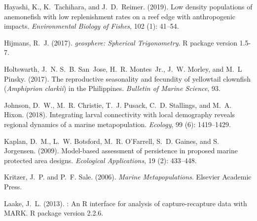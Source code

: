 \documentclass[12pt, oneside]{article}   	%
\begin{document}
\begin{thebibliography}{66}
Hayashi, K., K.~Tachihara, and J.~D.~Reimer. (2019).
\newblock Low density populations of anemonefish with low replenishment rates
  on a reef edge with anthropogenic impacts.
\newblock \emph{Environmental Biology of Fishes}, 102 (1):
  41--54.

Hijmans, R.~J. (2017).
\newblock \emph{geosphere: Spherical Trigonometry}.
\newblock R package version 1.5-7.

Holtswarth, J.~N. S.~B. San~Jose, H.~R. Montes~Jr., J.~W.
  Morley, and M.~L Pinsky. (2017).
\newblock The reproductive seasonality and fecundity of yellowtail clownfish
  (\textit{Amphiprion clarkii}) in the Philippines.
\newblock \emph{Bulletin of Marine Science}, 93.

Johnson, D.~W., M.~R. Christie, T.~J. Pusack, C.~D. Stallings,
  and M.~A. Hixon. (2018).
\newblock Integrating larval connectivity with local demography reveals
  regional dynamics of a marine metapopulation.
\newblock \emph{Ecology}, 99 (6): 1419--1429.

Kaplan, D.~M., L.~W. Botsford, M.~R. O'Farrell, S.~D. Gaines, and
  S. Jorgensen. (2009).
\newblock Model-based assessment of persistence in proposed marine protected
  area designs.
\newblock \emph{Ecological Applications}, 19 (2): 433--448.

Kritzer, J.~P. and P.~F. Sale. (2006).
\newblock \emph{Marine Metapopulations}.
\newblock Elsevier Academic Press.

Laake, J.~L. (2013).
: An R interface for analysis of capture-recapture data with
  {MARK}.
\newblock R package version 2.2.6.


\end{thebibliography}
\end{document}
